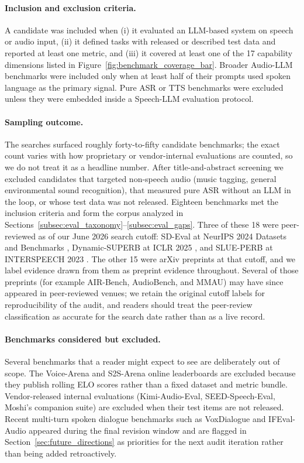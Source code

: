 \paragraph{Inclusion and exclusion criteria.}
A candidate was included when (i) it evaluated an LLM-based system on
speech or audio input, (ii) it defined tasks with released or
described test data and reported at least one metric, and (iii) it
covered at least one of the 17 capability dimensions listed in
Figure~\ref{fig:benchmark_coverage_bar}. Broader Audio-LLM benchmarks
were included only when at least half of their prompts used spoken
language as the primary signal. Pure ASR or TTS benchmarks were
excluded unless they were embedded inside a Speech-LLM evaluation
protocol.

\paragraph{Sampling outcome.}
The searches surfaced roughly forty-to-fifty candidate benchmarks; the
exact count varies with how proprietary or vendor-internal
evaluations are counted, so we do not treat it as a headline number.
After title-and-abstract screening we excluded candidates that
targeted non-speech audio (music tagging, general environmental sound
recognition), that measured pure ASR without an LLM in the loop, or
whose test data was not released. Eighteen benchmarks met the
inclusion criteria and form the corpus analyzed in
Sections~\ref{subsec:eval_taxonomy}--\ref{subsec:eval_gaps}. Three of
these 18 were peer-reviewed as of our June 2026 search cutoff:
SD-Eval at NeurIPS 2024 Datasets and Benchmarks
\citep{ao2024sdeval}, Dynamic-SUPERB at ICLR 2025
\citep{huang2024dynamicsuperb}, and SLUE-PERB at INTERSPEECH 2023
\citep{shon2023slue}. The other 15 were arXiv preprints at that
cutoff, and we label evidence drawn from them as preprint evidence
throughout. Several of those preprints (for example AIR-Bench,
AudioBench, and MMAU) may have since appeared in peer-reviewed
venues; we retain the original cutoff labels for reproducibility of
the audit, and readers should treat the peer-review classification
as accurate for the search date rather than as a live record.

\paragraph{Benchmarks considered but excluded.}
Several benchmarks that a reader might expect to see are deliberately
out of scope. The Voice-Arena and S2S-Arena online leaderboards are
excluded because they publish rolling ELO scores rather than a fixed
dataset and metric bundle. Vendor-released internal evaluations
(Kimi-Audio-Eval, SEED-Speech-Eval, Moshi's companion suite) are
excluded when their test items are not released. Recent
multi-turn spoken dialogue benchmarks such as VoxDialogue and
IFEval-Audio appeared during the final revision window and are
flagged in Section~\ref{sec:future_directions} as priorities for the
next audit iteration rather than being added retroactively.

